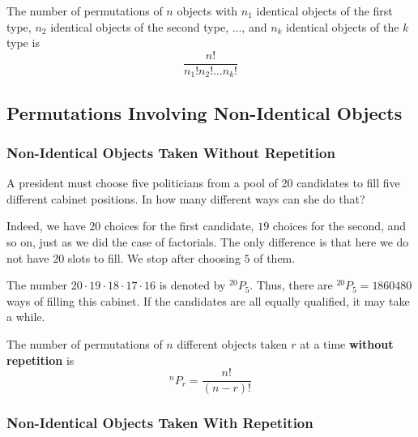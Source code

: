 \documentclass[11pt,a4paper]{book}
\begin{document}
\medskip{}

\begin{tcolorbox}[colback=blue!5, colframe=black, boxrule=.4pt, sharpish corners]

The number of permutations of $n$ objects with $n_{1}$ identical
objects of the first type, $n_{2}$ identical objects of the second
type, ..., and $n_{k}$ identical objects of the $k$ type is 
\[
\frac{n!}{n_{1}!n_{2}!\ldots n_{k}!}
\]
\end{tcolorbox}


\subsection{Permutations Involving Non-Identical Objects}

\subsubsection{Non-Identical Objects Taken Without Repetition}

\begin{example}

A president must choose five politicians from a pool of 20 candidates
to fill five different cabinet positions. In how many different ways
can she do that?

\Solution

Indeed, we have $20$ choices for the first candidate, $19$ choices
for the second, and so on, just as we did the case of factorials.
The only difference is that here we do not have $20$ slots to fill.
We stop after choosing $5$ of them. 

The number $20\cdot19\cdot18\cdot17\cdot16$ is denoted by $^{20}P_{5}$.
Thus, there are $^{20}P_{5}=1860480$ ways of filling this cabinet.
If the candidates are all equally qualified, it may take a while.

\end{example}

\medskip{}

\begin{tcolorbox}[colback=blue!5, colframe=black, boxrule=.4pt, sharpish corners]

The number of permutations of $n$ different objects taken $r$ at
a time \textbf{without repetition} is 
\[
^{n}P_{r}=\frac{n!}{\left(n-r\right)!}
\]
\end{tcolorbox}


\subsubsection{Non-Identical Objects Taken With Repetition}
\end{document}
